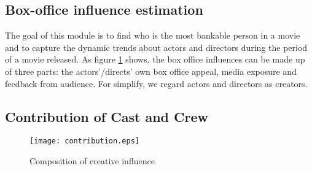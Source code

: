 \subsection{Box-office influence estimation}
\label{sec:impact}
\par The goal of this module is to find who is the most bankable person in a movie and to capture the dynamic trends about actors and directors during the period of a movie released. As figure \ref{fig:influ} shows, the box office influences can be made up of three parts: the actors'/directs' own box office appeal, media exposure and feedback from audience. For simplify, we regard actors and directors as creators.

\subsection{Contribution of Cast and Crew}

\begin{figure}[!htbp]
\centering
\texttt{[image: contribution.eps]}
\caption{Composition of creative influence}
\label{fig:influ}
\end{figure}

